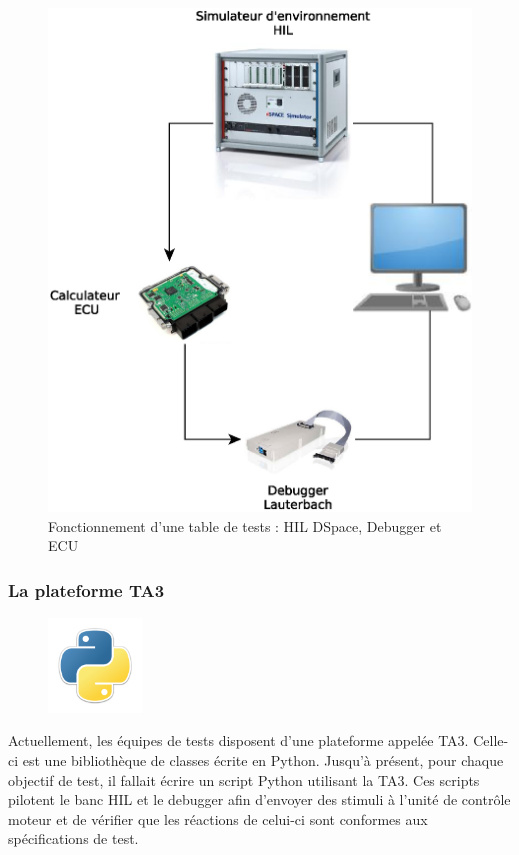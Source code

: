 		\begin{figure}[H]
			\centering
			\includegraphics[width=11.5cm]{contents/images/WB.eps}
			\caption{Fonctionnement d'une table de tests : HIL DSpace, Debugger et ECU}
			\label{fig:wb}
		\end{figure}
		
			\subsubsection{La plateforme TA3}\label{ta3}
			\begin{figure}
				\includegraphics[width=2.5cm]{contents/images/python.png}
			\end{figure}
			Actuellement, les équipes de tests disposent d'une plateforme appelée TA3. Celle-ci est une bibliothèque de classes écrite en Python. Jusqu'à présent, pour chaque objectif de test, il fallait écrire un script Python utilisant la TA3. Ces scripts pilotent le banc HIL et le debugger afin d'envoyer des stimuli à l'unité de contrôle moteur et de vérifier que les réactions de celui-ci sont conformes aux spécifications de test.
			
